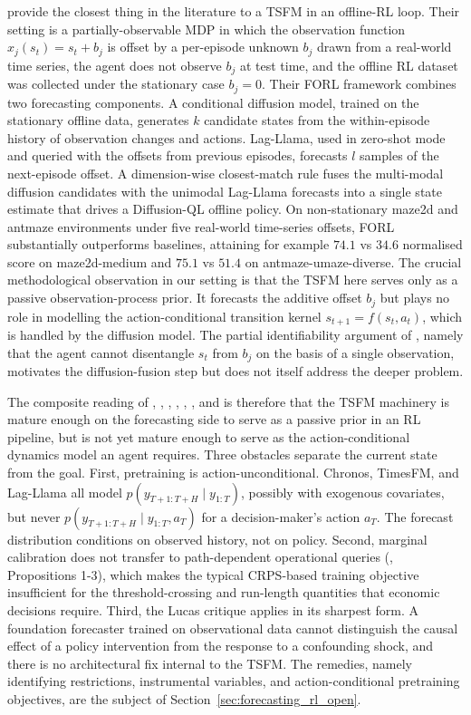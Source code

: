 \citet{Ada2025} provide the closest thing in the literature to a TSFM in an
offline-RL loop. Their setting is a partially-observable MDP in which the
observation function $x_j(s_t) = s_t + b_j$ is offset by a per-episode unknown
$b_j$ drawn from a real-world time series, the agent does not observe $b_j$ at
test time, and the offline RL dataset was collected under the stationary case
$b_j = 0$. Their FORL framework combines two forecasting components. A
conditional diffusion model, trained on the stationary offline data, generates
$k$ candidate states from the within-episode history of observation changes and
actions. Lag-Llama, used in zero-shot mode and queried with the offsets from
previous episodes, forecasts $l$ samples of the next-episode offset. A
dimension-wise closest-match rule fuses the multi-modal diffusion candidates
with the unimodal Lag-Llama forecasts into a single state estimate that drives
a Diffusion-QL offline policy. On non-stationary maze2d and antmaze
environments under five real-world time-series offsets, FORL substantially
outperforms baselines, attaining for example $74.1$ vs $34.6$ normalised score
on maze2d-medium and $75.1$ vs $51.4$ on antmaze-umaze-diverse. The crucial
methodological observation in our setting is that the TSFM here serves only as
a passive observation-process prior. It forecasts the additive offset $b_j$ but
plays no role in modelling the action-conditional transition kernel
$s_{t+1} = f(s_t, a_t)$, which is handled by the diffusion model. The partial
identifiability argument of \citet{Ada2025}, namely that the agent cannot
disentangle $s_t$ from $b_j$ on the basis of a single observation, motivates
the diffusion-fusion step but does not itself address the deeper problem.

The composite reading of \citet{Ansari2024}, \citet{Das2024}, \citet{Rasul2023},
\citet{PerezDiaz2025}, \citet{Rahimikia2025}, \citet{Jetwiriyanon2025}, and
\citet{Ada2025} is therefore that the TSFM machinery is mature enough on the
forecasting side to serve as a passive prior in an RL pipeline, but is not yet
mature enough to serve as the action-conditional dynamics model an agent
requires. Three obstacles separate the current state from the goal. First,
pretraining is action-unconditional. Chronos, TimesFM, and Lag-Llama all model
$p(y_{T+1:T+H} \mid y_{1:T})$, possibly with exogenous covariates, but never
$p(y_{T+1:T+H} \mid y_{1:T}, a_T)$ for a decision-maker's action $a_T$. The
forecast distribution conditions on observed history, not on policy. Second,
marginal calibration does not transfer to path-dependent operational queries
(\citealp{PerezDiaz2025}, Propositions 1-3), which makes the typical CRPS-based
training objective insufficient for the threshold-crossing and run-length
quantities that economic decisions require. Third, the Lucas critique applies in
its sharpest form. A foundation forecaster trained on observational data cannot
distinguish the causal effect of a policy intervention from the response to a
confounding shock, and there is no architectural fix internal to the TSFM. The
remedies, namely identifying restrictions, instrumental variables, and
action-conditional pretraining objectives, are the subject of
Section~\ref{sec:forecasting_rl_open}.
